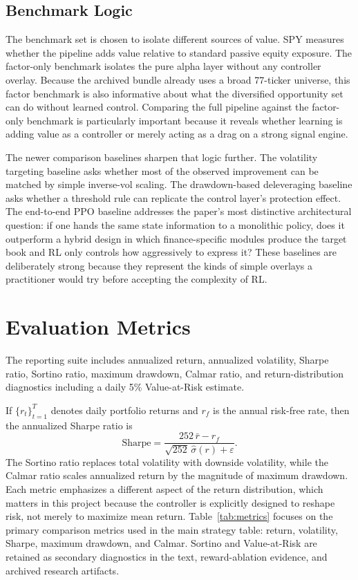 \documentclass[11pt]{article}
\begin{document}
\subsection{Benchmark Logic}

The benchmark set is chosen to isolate different sources of value. SPY measures
whether the pipeline adds value relative to standard passive equity exposure.
The factor-only benchmark isolates the pure alpha layer without any controller
overlay. Because the archived bundle already uses a broad 77-ticker universe,
this factor benchmark is also informative about what the diversified opportunity
set can do without learned control. Comparing the full pipeline against the
factor-only benchmark is particularly important because it reveals whether
learning is adding value as a controller or merely acting as a drag on a strong
signal engine.

The newer comparison baselines sharpen that logic further. The volatility
targeting baseline asks whether most of the observed improvement can be matched
by simple inverse-vol scaling. The drawdown-based deleveraging baseline asks
whether a threshold rule can replicate the control layer's protection effect.
The end-to-end PPO baseline addresses the paper's most distinctive
architectural question: if one hands the same state information to a monolithic
policy, does it outperform a hybrid design in which finance-specific modules
produce the target book and RL only controls how aggressively to express it?
These baselines are deliberately strong because they represent the kinds of
simple overlays a practitioner would try before accepting the complexity of RL.

\section{Evaluation Metrics}

The reporting suite includes annualized return, annualized volatility, Sharpe
ratio, Sortino ratio, maximum drawdown, Calmar ratio, and return-distribution
diagnostics including a daily 5\% Value-at-Risk estimate.

If $\{r_t\}_{t=1}^T$ denotes daily portfolio returns and $r_f$ is the annual
risk-free rate, then the annualized Sharpe ratio is
\[
\text{Sharpe} = \frac{252 \, \bar{r} - r_f}{\sqrt{252}\,\hat{\sigma}(r) + \varepsilon}.
\]
The Sortino ratio replaces total volatility with downside volatility, while the
Calmar ratio scales annualized return by the magnitude of maximum drawdown. Each
metric emphasizes a different aspect of the return distribution, which matters
in this project because the controller is explicitly designed to reshape risk,
not merely to maximize mean return. Table~\ref{tab:metrics} focuses on the
primary comparison metrics used in the main strategy table: return, volatility,
Sharpe, maximum drawdown, and Calmar. Sortino and Value-at-Risk are retained as
secondary diagnostics in the text, reward-ablation evidence, and archived
research artifacts.
\end{document}
